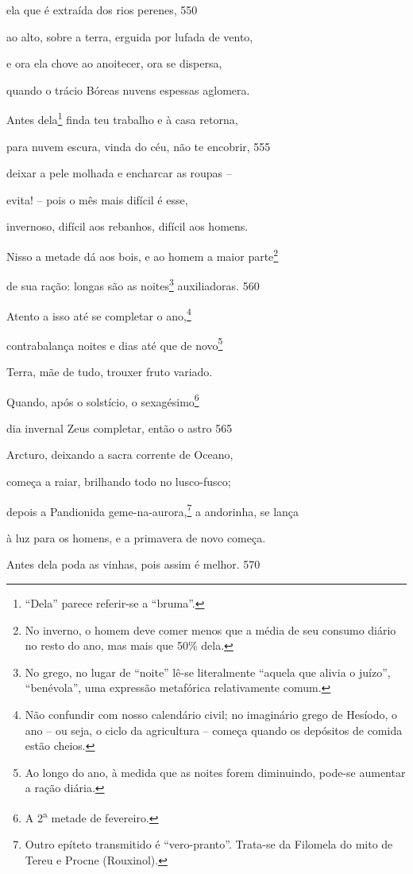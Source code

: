 ela que é extraída dos rios perenes, \num{550}

ao alto, sobre a terra, erguida por lufada de vento,

e ora ela chove ao anoitecer, ora se dispersa,

quando o trácio Bóreas nuvens espessas aglomera.

Antes dela\footnote{``Dela'' parece referir-se a ``bruma''.} finda teu trabalho e à casa retorna,

para nuvem escura, vinda do céu, não te encobrir, \num{555}

deixar a pele molhada e encharcar as roupas --

evita! -- pois o mês mais difícil é esse,

invernoso, difícil aos rebanhos, difícil aos homens.

Nisso a metade dá aos bois, e ao homem a maior parte\footnote{No inverno, o homem deve comer menos que a média de seu consumo diário no resto do ano, mas mais que 50\% dela.}

de sua ração: longas são as noites\footnote{No grego, no lugar de ``noite'' lê-se literalmente ``aquela que alivia o juízo'', ``benévola'', uma expressão metafórica relativamente comum.} auxiliadoras. \num{560}

Atento a isso até se completar o ano,\footnote{Não confundir com nosso calendário civil; no imaginário grego de
Hesíodo, o ano -- ou seja, o ciclo da agricultura -- começa quando os
depósitos de comida estão cheios.}

contrabalança noites e dias até que de novo\footnote{Ao longo do ano, à medida que as noites forem diminuindo, pode-se aumentar a ração diária.}

Terra, mãe de tudo, trouxer fruto variado.

Quando, após o solstício, o sexagésimo\footnote{A 2\textsuperscript{a} metade de fevereiro.}

dia invernal Zeus completar, então o astro \num{565}

Arcturo, deixando a sacra corrente de Oceano,

começa a raiar, brilhando todo no lusco-fusco;

depois a Pandionida geme-na-aurora,\footnote{Outro epíteto transmitido é ``vero-pranto''. Trata-se da Filomela
do mito de Tereu e Procne (Rouxinol).} a andorinha, se lança

à luz para os homens, e a primavera de novo começa.

Antes dela poda as vinhas, pois assim é melhor. \num{570}

